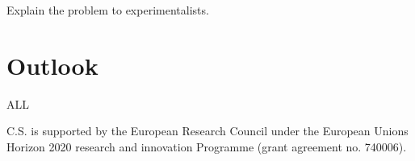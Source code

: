 \documentclass[a4paper,11pt]{article}
\begin{document}
Explain the problem to experimentalists.\\

\section{Outlook}

ALL

\cite{Carli:2010rw}
\cite{Bertone:2014zva}

\appendix

\acknowledgments

C.S. is supported by the European Research Council under the European Unions Horizon 2020 research and innovation Programme (grant agreement no. 740006).



\end{document}
